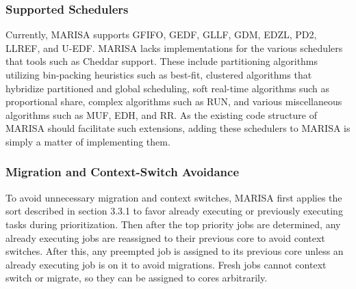 \documentclass[conference,compsoc]{IEEEtran}
\begin{document}
\subsubsection{Supported Schedulers}
Currently, MARISA supports GFIFO, GEDF, GLLF, GDM, EDZL, PD2, LLREF, and U-EDF. MARISA lacks implementations for the various schedulers that tools such as Cheddar support. These include partitioning algorithms utilizing bin-packing heuristics such as best-fit, clustered algorithms that hybridize partitioned and global scheduling, soft real-time algorithms such as proportional share, complex algorithms such as RUN, and various miscellaneous algorithms such as MUF, EDH, and RR. As the existing code structure of MARISA should facilitate such extensions, adding these schedulers to MARISA is simply a matter of implementing them.

\subsubsection{Migration and Context-Switch Avoidance}
To avoid unnecessary migration and context switches, MARISA first applies the sort described in section 3.3.1 to favor already executing or previously executing tasks during prioritization. Then after the top priority jobs are determined, any already executing jobs are reassigned to their previous core to avoid context switches. After this, any preempted job is assigned to its previous core unless an already executing job is on it to avoid migrations. Fresh jobs cannot context switch or migrate, so they can be assigned to cores arbitrarily.
\end{document}
